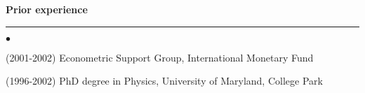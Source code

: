 \documentclass[11pt]{article}
\begin{document}
\noindent
\large\textsf{\textbf {Prior experience}}

\vspace*{-8pt}
\noindent
\rule{165mm}{0.25mm}
\normalfont\normalsize
\vspace*{-12pt}
\begin{list}{$\bullet$}
   {\setlength{\itemsep}{0ex}
    \setlength{\parsep}{1ex}} 
    \item (2001-2002) Econometric Support Group, International
      Monetary Fund
    \item (1996-2002) PhD degree in Physics, University of Maryland,
      College Park   
\end{list}
\end{document}
